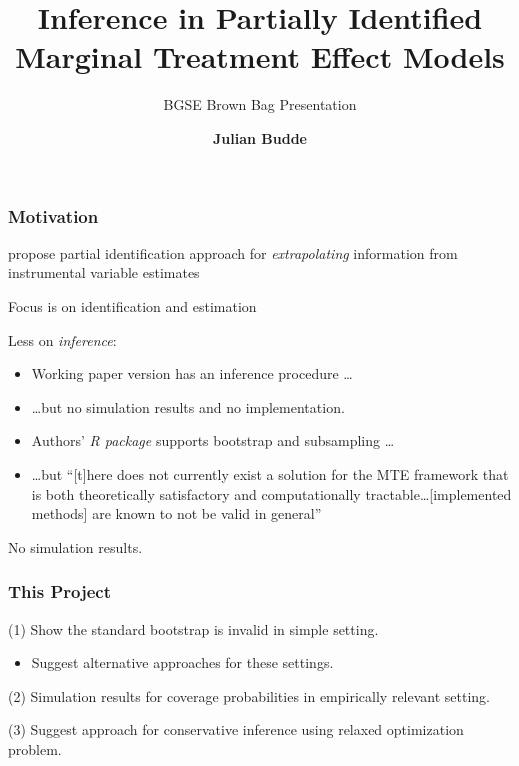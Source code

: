 \documentclass[11pt, aspectratio=169]{beamer}
\title{Inference in Partially Identified Marginal Treatment Effect Models}
\subtitle{BGSE Brown Bag Presentation}
\author[Julian Budde]{\bf Julian Budde}
\begin{document}
\begin{frame}
    \titlepage
    \note{~}
\end{frame}

\begin{frame}
    \frametitle{Motivation}

    \citet{mogstad2018using} propose partial identification approach for \textit{extrapolating} information from instrumental variable estimates

    \vspace{0.5cm}

    Focus is on identification and estimation

    \vspace{0.5cm}

    Less on \textit{inference}:

    \vspace{0.5cm}
    \pause
    \begin{itemize}
        \footnotesize
        \item Working paper version has an inference procedure \dots
        \item \dots but no simulation results and no implementation.
        \pause
        \item Authors' \textit{R package} supports bootstrap and subsampling \dots
        \item \dots but ``[t]here does not currently exist a solution for the MTE framework that is both theoretically
        satisfactory and computationally tractable\dots [implemented methods] are known to not be valid in general''
    \end{itemize}

    \vspace{0.5cm}
    No simulation results.

\end{frame}

\begin{frame}
    \frametitle{This Project}

        (1) Show the standard bootstrap is invalid in simple setting.
        \begin{itemize}
            \item Suggest alternative approaches for these settings.
        \end{itemize}

        \vspace{0.5cm}
        (2) Simulation results for coverage probabilities in empirically relevant setting.

        \vspace{0.5cm}
        (3) Suggest approach for conservative inference using relaxed optimization problem.

\end{frame}
\end{document}
